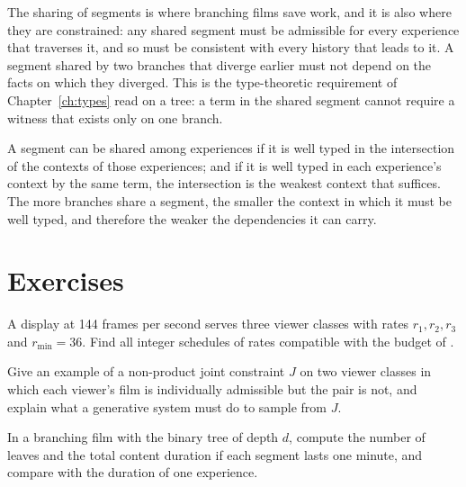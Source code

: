 The sharing of segments is where branching films save work, and it is also where they are constrained: any shared segment must be admissible for every experience that traverses it, and so must be consistent with every history that leads to it. A segment shared by two branches that diverge earlier must not depend on the facts on which they diverged. This is the type-theoretic requirement of Chapter~\ref{ch:types} read on a tree: a term in the shared segment cannot require a witness that exists only on one branch.

\begin{principle}\label{pr:shared}
A segment can be shared among experiences if it is well typed in the intersection of the contexts of those experiences; and if it is well typed in each experience's context by the same term, the intersection is the weakest context that suffices. The more branches share a segment, the smaller the context in which it must be well typed, and therefore the weaker the dependencies it can carry.
\end{principle}

\section*{Exercises}

\begin{exercise}
A display at 144 frames per second serves three viewer classes with rates $r_1,r_2,r_3$ and $r_{\min}=36$. Find all integer schedules of rates compatible with the budget of .
\end{exercise}

\begin{exercise}
Give an example of a non-product joint constraint $J$ on two viewer classes in which each viewer's film is individually admissible but the pair is not, and explain what a generative system must do to sample from $J$.
\end{exercise}

\begin{exercise}
In a branching film with the binary tree of depth $d$, compute the number of leaves and the total content duration if each segment lasts one minute, and compare with the duration of one experience.
\end{exercise}
